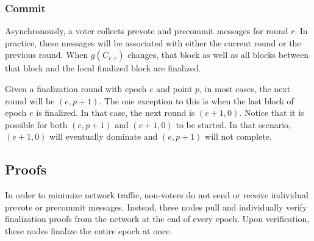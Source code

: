 \subsubsection{Commit}

Asynchronously, a voter collects prevote and precommit messages for round $r$.
In practice, these messages will be associated with either the current round or the previous round.
When $g(C_{r,v})$ changes, that block as well as all blocks between that block and the local finalized block are finalized.

Given a finalization round with epoch $e$ and point $p$, in most cases, the next round will be $(e, p + 1)$.
The one exception to this is when the last block of epoch $e$ is finalized.
In that case, the next round is $(e + 1, 0)$.
Notice that it is possible for both $(e, p + 1)$ and $(e + 1, 0)$ to be started.
In that scenario, $(e + 1, 0)$ will eventually dominate and $(e, p + 1)$ will not complete.

\subsection{Proofs}

In order to minimize network traffic, non-voters do not send or receive individual prevote or precommit messages.
Instead, these nodes pull and individually verify finalization proofs from the network at the end of every epoch.
Upon verification, these nodes finalize the entire epoch at once.

